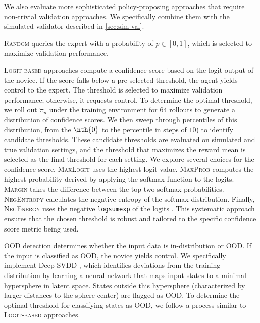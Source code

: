 We also evaluate more sophisticated policy-proposing approaches that require non-trivial validation approaches. 
We specifically combine them with the simulated validator described in \autoref{sec:sim-val}. 

\textsc{Random} queries the expert with a probability of $p \in [0,1]$, which is selected to maximize validation performance.

\textsc{Logit-based} approaches compute a confidence score based on the logit output of the novice. If the score falls below a pre-selected threshold, the agent yields control to the expert. The threshold is selected to maximize validation performance; otherwise, it requests control. To determine the optimal threshold, we roll out $\tilde \pi_{n}$ under the training environment for $64$ rollouts to generate a distribution of confidence scores. We then sweep through percentiles of this distribution, from the $\nth{0}$ to the  percentile in steps of $10$) to identify candidate thresholds. These candidate thresholds are evaluated on simulated and true validation settings, and the threshold that maximizes the reward mean is selected as the final threshold for each setting. We explore several choices for the confidence score. \textsc{MaxLogit} uses the highest logit value. \textsc{MaxProb} computes the highest probability derived by applying the softmax function to the logits. \textsc{Margin} takes the difference between the top two softmax probabilities. \textsc{NegEntropy} calculates the negative entropy of the softmax distribution. Finally, \textsc{NegEnergy} uses the negative \texttt{logsumexp} of the logits \citep{liu2020energy}. This systematic approach ensures that the chosen threshold is robust and tailored to the specific confidence score metric being used.

\textsc{OOD} detection determines whether the input data is in-distribution or OOD. 
If the input is classified as OOD, the novice yields control. 
We specifically implement Deep SVDD \citep{pmlr-v80-ruff18a}, which identifies deviations from the training distribution by learning a neural network that maps input states to a minimal hypersphere in latent space. States outside this hypersphere (characterized by larger distances to the sphere center) are flagged as OOD. 
To determine the optimal threshold for classifying states as OOD, we follow a process similar to \textsc{Logit-based} approaches.

